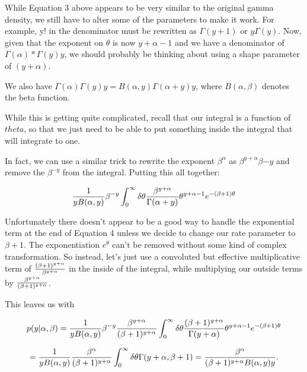 \documentclass{article}
\begin{document}
While Equation 3 above appears to be very similar to the original gamma density, we still have to alter some of the parameters
to make it work. For example, y! in the denominator must be rewritten as \(\Gamma(y+1)\) or \(y\Gamma(y)\). Now, given that
the exponent on \(\theta\) is now \(y + \alpha - 1\) and we have a denominator of \( \Gamma(\alpha)*\Gamma(y)y\),
we should probably be thinking about using a shape parameter of \((y + \alpha)\).

We also have \( \Gamma(\alpha)\Gamma(y)y = B(\alpha, y)\Gamma(\alpha + y)y\), where \(B(\alpha, \beta)\) denotes the beta function.

While this is getting quite complicated, recall that our integral is a function of \(theta\), so that
we just need to be able to put something inside the integral that will integrate to one.

In fact, we can use a similar trick to rewrite the exponent \(\beta^\alpha\) as \(\beta^{y + \alpha}\beta{-y}\) and remove
the \(\beta^{-y}\) from the integral. Putting this all together:

\begin{equation}
{1 \over yB(\alpha, y)} \beta^{-y} \int_{0}^{\infty} \delta\theta {\beta^{y + \alpha} \over \Gamma(\alpha + y)} \theta^{y + \alpha - 1} e^{-(\beta + 1)\theta}
\end{equation}

Unfortunately there doesn't appear to be a good way to handle the exponential term at the end of Equation 4 unless we decide to change our rate parameter to \(\beta + 1\). 
The exponentiation \(e^\theta\) can't be removed without some kind of complex transformation. So instead, let's just use a convoluted but
effective multiplicative term of \( { (\beta + 1)^{y + \alpha} \over \beta^{y + \alpha} }\) in the inside of the integral, while
multiplying our outside terms by \( { \beta^{y + \alpha} \over (\beta + 1)^{y + \alpha} }\). 

This leaves us with 

\[p(y \vert \alpha, \beta) = {1 \over yB(\alpha, y) }\beta^{-y} { \beta^{y + \alpha} \over (\beta + 1)^{y + \alpha} } 
\int_{0}^{\infty} \delta\theta {(\beta + 1)^{y + \alpha} \over \Gamma(y + \alpha)} \theta^{y + \alpha - 1} e^{-(\beta + 1)\theta}\]

\begin{equation}
= {1 \over yB(\alpha, y) }{ \beta^{\alpha} \over (\beta + 1)^{y + \alpha} } \int_{0}^{\infty} \delta\theta \Gamma(y + \alpha, \beta + 1)
= {\beta^{\alpha} \over (\beta + 1)^{y + \alpha} B(\alpha, y) y}.
\end{equation}
\end{document}
